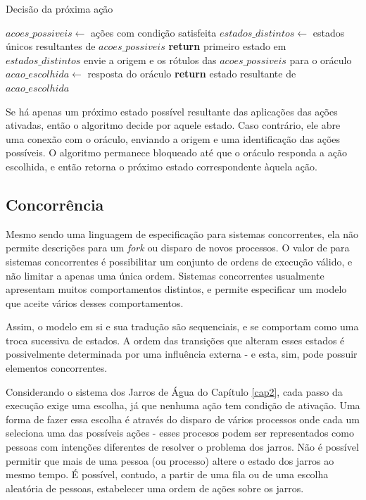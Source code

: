 \begin{algorithm}
\caption{Decisão da próxima ação}\label{alg:decide-action}
\begin{algorithmic}[1]
\State $acoes\_possiveis\gets$ ações com condição satisfeita
\State $estados\_distintos\gets$ estados únicos resultantes de $acoes\_possiveis$
\State \textbf{return} primeiro estado em $estados\_distintos$
\Else{}
\State envie a origem e os rótulos das $acoes\_possiveis$ para o oráculo
\State $acao\_escolhida\gets$ resposta do oráculo
\State \textbf{return} estado resultante de $acao\_escolhida$
\EndIf
\EndProcedure
\end{algorithmic}
\end{algorithm}

Se há apenas um próximo estado possível resultante das aplicações das ações
ativadas, então o algoritmo decide por aquele estado. Caso contrário, ele abre
uma conexão com o oráculo, enviando a origem e uma identificação das ações
possíveis. O algoritmo permanece bloqueado até que o oráculo responda a ação
escolhida, e então retorna o próximo estado correspondente àquela ação.


\subsection{Concorrência}

Mesmo \TLA sendo uma linguagem de especificação para sistemas concorrentes, ela
não permite descrições para um \textit{fork} ou disparo de novos
processos. O valor de \TLA para sistemas concorrentes é possibilitar um conjunto
de ordens de execução válido, e não limitar a apenas uma única ordem. Sistemas
concorrentes usualmente apresentam muitos comportamentos distintos, e \TLA
permite especificar um modelo que aceite vários desses comportamentos.

Assim, o modelo em si e sua tradução são sequenciais, e se comportam como uma troca
sucessiva de estados. A ordem das transições que alteram esses estados é
possivelmente determinada por uma influência externa - e esta, sim, pode possuir
elementos concorrentes.

Considerando o sistema dos Jarros de Água do Capítulo \ref{cap2}, cada passo da
execução exige uma escolha, já que nenhuma ação tem condição de ativação. Uma
forma de fazer essa escolha é através do disparo de vários processos onde cada
um seleciona uma das possíveis ações - esses procesos podem ser representados
como pessoas com intenções diferentes de resolver o problema dos jarros. Não é
possível permitir que mais de uma pessoa (ou processo) altere o estado dos
jarros ao mesmo tempo. É possível, contudo, a partir de uma fila ou de uma
escolha aleatória de pessoas, estabelecer uma ordem de ações sobre os jarros.

